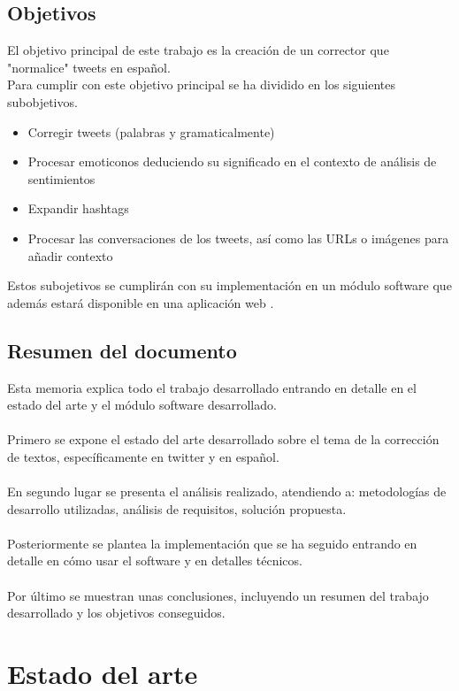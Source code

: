 \documentclass[spanish,12pt, a4paper,twoside]{paper}
\let\oldsection\section
\def\section{\cleardoublepage\oldsection}
\begin{document}
\subsection{Objetivos}\label{sec:objetivos}
El objetivo principal de este trabajo es la creación de un corrector que "normalice" tweets en español.\\Para cumplir con este objetivo principal se ha dividido en los siguientes subobjetivos.
\begin{itemize}
\item Corregir tweets (palabras y gramaticalmente)
\item Procesar emoticonos deduciendo su significado en el contexto de análisis de sentimientos
\item Expandir hashtags
\item Procesar las conversaciones de los tweets, así como las URLs o imágenes para añadir contexto
\end{itemize}
Estos subojetivos se cumplirán con su implementación en un módulo software que además estará disponible en una aplicación web \cite{tweetscweb}.

\subsection{Resumen del documento}\label{sec:resumen}
Esta memoria explica todo el trabajo desarrollado entrando en detalle en el estado del arte y el  módulo software desarrollado.\\\\
Primero se expone el estado del arte desarrollado sobre el tema de la corrección de textos, específicamente en twitter y en español.\\\\
En segundo lugar se presenta el análisis realizado, atendiendo a: metodologías de desarrollo utilizadas, análisis de requisitos, solución propuesta.\\\\
Posteriormente se plantea la implementación que se ha seguido entrando en detalle en cómo usar el software y en detalles técnicos.\\\\
Por último se muestran unas conclusiones, incluyendo un resumen del trabajo desarrollado y los objetivos conseguidos.
\section{Estado del arte}\label{sec:estadodelarte}
\end{document}
